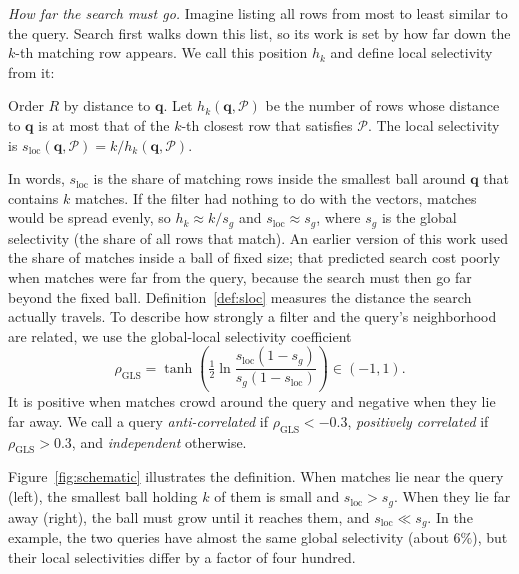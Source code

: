 \documentclass[sigconf,nonacm]{acmart}
\newcommand{\sg}{s_g}
\newcommand{\sloc}{s_{\text{loc}}}
\begin{document}
\emph{How far the search must go.} Imagine listing all rows from most to least similar to the query. Search first walks down this list, so its work is set by how far down the $k$-th matching row appears. We call this position $h_k$ and define local selectivity from it:
\begin{definition}\label{def:sloc}
Order $R$ by distance to $\mathbf{q}$. Let $h_k(\mathbf{q},\mathcal{P})$ be the number of rows whose distance to $\mathbf{q}$ is at most that of the $k$-th closest row that satisfies $\mathcal{P}$. The local selectivity is $\sloc(\mathbf{q},\mathcal{P}) = k/h_k(\mathbf{q},\mathcal{P})$.
\end{definition}
In words, $\sloc$ is the share of matching rows inside the smallest ball around $\mathbf{q}$ that contains $k$ matches. If the filter had nothing to do with the vectors, matches would be spread evenly, so $h_k \approx k/\sg$ and $\sloc\approx\sg$, where $\sg$ is the global selectivity (the share of all rows that match). An earlier version of this work used the share of matches inside a ball of fixed size; that predicted search cost poorly when matches were far from the query, because the search must then go far beyond the fixed ball. Definition~\ref{def:sloc} measures the distance the search actually travels. To describe how strongly a filter and the query's neighborhood are related, we use the global-local selectivity coefficient~\cite{amanbayev2026fanns}
\begin{equation}\label{eq:gls}
\rho_{\text{GLS}} = \tanh\!\left(\tfrac{1}{2}\ln\frac{\sloc(1-\sg)}{\sg(1-\sloc)}\right)\in(-1,1).
\end{equation}
It is positive when matches crowd around the query and negative when they lie far away. We call a query \emph{anti-correlated} if $\rho_{\text{GLS}}<-0.3$, \emph{positively correlated} if $\rho_{\text{GLS}}>0.3$, and \emph{independent} otherwise.

Figure~\ref{fig:schematic} illustrates the definition. When matches lie near the query (left), the smallest ball holding $k$ of them is small and $\sloc>\sg$. When they lie far away (right), the ball must grow until it reaches them, and $\sloc\ll\sg$. In the example, the two queries have almost the same global selectivity (about $6\%$), but their local selectivities differ by a factor of four hundred.
\end{document}
